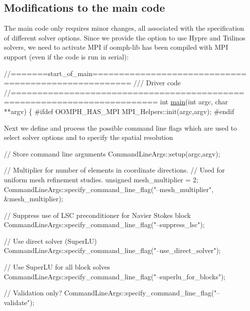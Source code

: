 \hypertarget{index_driver}{}\subsection{Modifications to the main code}\label{index_driver}
The main code only requires minor changes, all associated with the specification of different solver options. Since we provide the option to use Hypre and Trilinos solvers, we need to activate M\+PI if {\ttfamily oomph-\/lib} has been compiled with M\+PI support (even if the code is run in serial)\+:

 
\begin{DoxyCodeInclude}
\textcolor{comment}{//=======start\_of\_main=====================================================}
\textcolor{comment}{/// Driver code }
\textcolor{comment}{}\textcolor{comment}{//=========================================================================}
\textcolor{keywordtype}{int} \hyperlink{fsi__channel__with__leaflet__precond_8cc_a3c04138a5bfe5d72780bb7e82a18e627}{main}(\textcolor{keywordtype}{int} argc, \textcolor{keywordtype}{char} **argv)
\{
\textcolor{preprocessor}{#ifdef OOMPH\_HAS\_MPI}
 MPI\_Helpers::init(argc,argv);
\textcolor{preprocessor}{#endif}

\end{DoxyCodeInclude}


Next we define and process the possible command line flags which are used to select solver options and to specify the spatial resolution


\begin{DoxyCodeInclude}
 \textcolor{comment}{// Store command line arguments}
 CommandLineArgs::setup(argc,argv);

 \textcolor{comment}{// Multiplier for number of elements in coordinate directions.}
 \textcolor{comment}{// Used for uniform mesh refinement studies.}
 \textcolor{keywordtype}{unsigned} mesh\_multiplier = 2; 
 CommandLineArgs::specify\_command\_line\_flag(\textcolor{stringliteral}{"--mesh\_multiplier"},
                                            &mesh\_multiplier);

 \textcolor{comment}{// Suppress use of LSC preconditioner for Navier Stokes block}
 CommandLineArgs::specify\_command\_line\_flag(\textcolor{stringliteral}{"--suppress\_lsc"});

 \textcolor{comment}{// Use direct solver (SuperLU)}
 CommandLineArgs::specify\_command\_line\_flag(\textcolor{stringliteral}{"--use\_direct\_solver"});
 
 \textcolor{comment}{// Use SuperLU for all block solves}
 CommandLineArgs::specify\_command\_line\_flag(\textcolor{stringliteral}{"--superlu\_for\_blocks"});

 \textcolor{comment}{// Validation only?}
 CommandLineArgs::specify\_command\_line\_flag(\textcolor{stringliteral}{"--validate"});

\end{DoxyCodeInclude}



